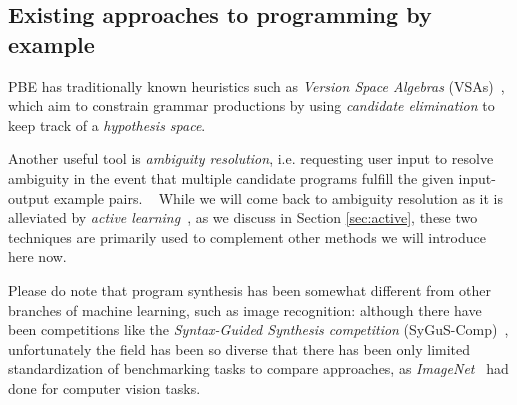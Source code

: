 \documentclass{article}
\begin{document}
\subsection{Existing approaches to programming by example} \label{sec:pbe}

PBE has traditionally known heuristics such as
\emph{Version Space Algebras} (VSAs)~\citep{mitchell1982generalization},
which aim to constrain grammar productions by using
\emph{candidate elimination} to keep track of a \emph{hypothesis space}.

Another useful tool is \emph{ambiguity resolution},
i.e. requesting user input to resolve ambiguity
in the event that multiple candidate programs
fulfill the given input-output example pairs.%
~\citep{gulwani2017program}
While we will come back to ambiguity resolution as it is
alleviated by \emph{active learning}~\citep{settles2009active}, as we discuss in Section \ref{sec:active},
these two techniques are primarily used to complement
other methods we will introduce here now.

Please do note that program synthesis has been somewhat different
from other branches of machine learning, such as image recognition:
although there have been competitions like the
\emph{Syntax-Guided Synthesis competition} (SyGuS-Comp)~\citep{sygus},
unfortunately the field has been so diverse that there has been only limited
standardization of benchmarking tasks to compare approaches,
as \emph{ImageNet}~\citep{deng2009imagenet} had done for computer vision tasks.%



\end{document}
